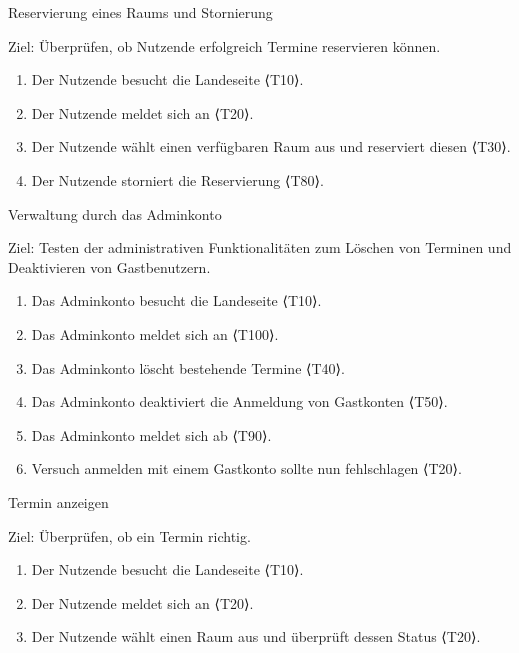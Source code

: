 \pagebreak

\begin{scenario}{20}{Reservierung eines Raums und Stornierung}
  \item[Ziel:] Überprüfen, ob Nutzende erfolgreich Termine reservieren können.
  \begin{enumerate}
    \item Der Nutzende besucht die Landeseite ⟨T10⟩.
    \item Der Nutzende meldet sich an ⟨T20⟩.
    \item Der Nutzende wählt einen verfügbaren Raum aus und reserviert diesen ⟨T30⟩.
    \item Der Nutzende storniert die Reservierung ⟨T80⟩.
  \end{enumerate}
\end{scenario}

\begin{scenario}{30}{Verwaltung durch das Adminkonto}
  \item[Ziel:] Testen der administrativen Funktionalitäten zum Löschen von Terminen und Deaktivieren von Gastbenutzern.
  \begin{enumerate}
    \item Das Adminkonto besucht die Landeseite ⟨T10⟩.
    \item Das Adminkonto meldet sich an ⟨T100⟩.
    \item Das Adminkonto löscht bestehende Termine ⟨T40⟩.
    \item Das Adminkonto deaktiviert die Anmeldung von Gastkonten ⟨T50⟩.
    \item Das Adminkonto meldet sich ab ⟨T90⟩.
    \item Versuch anmelden mit einem Gastkonto sollte nun fehlschlagen ⟨T20⟩.
  \end{enumerate}
\end{scenario}

\begin{scenario}{40}{Termin anzeigen}
  \item[Ziel:] Überprüfen, ob ein Termin richtig.
  \begin{enumerate}
    \item Der Nutzende besucht die Landeseite ⟨T10⟩.
    \item Der Nutzende meldet sich an ⟨T20⟩.
    \item Der Nutzende wählt einen Raum aus und überprüft dessen Status ⟨T20⟩.
  \end{enumerate}
\end{scenario}

